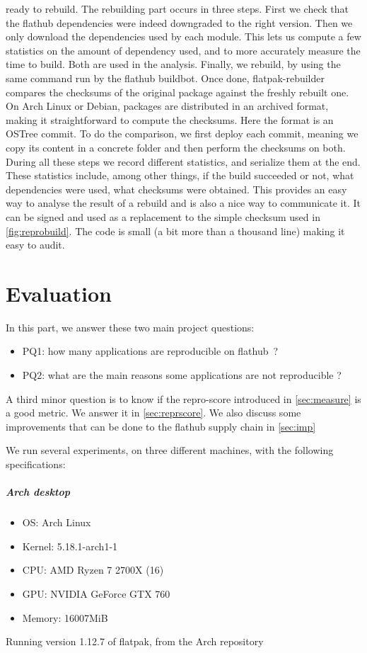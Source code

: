 \documentclass[a4paper,11pt,oneside]{report}
\theoremstyle{definition}
\newcommand{\sysname}{flatpak-rebuilder\xspace}
\newcommand{\fp}{flatpak\xspace}
\newcommand{\fh}{flathub\xspace}
\newcommand{\fhbb}{flathub buildbot\xspace}
\newcommand{\ot}{OSTree\xspace}
\begin{document}
ready to rebuild. The rebuilding part occurs in three steps. First we check
that the \fh dependencies were indeed downgraded to the right version. Then we
only download the dependencies used by each module. This lets us compute a few
statistics on the amount of dependency used, and to more accurately measure the
time to build. Both are used in the analysis. Finally, we rebuild, by using the
same command run by the \fhbb. Once done, \sysname compares the checksums of
the original package against the freshly rebuilt one. On Arch Linux or Debian,
packages are distributed in an archived format, making it straightforward to
compute the checksums. Here the format is an \ot commit. To do the
comparison, we first deploy each commit, meaning we copy its content in a
concrete folder and then perform the checksums on both. During all these steps
we record different statistics, and serialize them at the end. These statistics
include, among other things, if the build succeeded or not, what dependencies
were used, what checksums were obtained. This provides an easy way to analyse
the result of a rebuild and is also a nice way to communicate it. It can be
signed and used as a replacement to the simple checksum used in
\autoref{fig:reprobuild}. The code is small (a bit more than a thousand line)
making it easy to audit.

\chapter{Evaluation}
\label{chap:eval}

In this part, we answer these two main project questions:
\begin{itemize}
    \item PQ1: how many applications are reproducible on \fh~?
    \item PQ2: what are the main reasons some applications are not reproducible ?
\end{itemize}
A third minor question is to know if the repro-score introduced in
\autoref{sec:measure} is a good metric. We answer it in
\autoref{sec:reprscore}. We also discuss some improvements that can be done to
the \fh supply chain in \autoref{sec:imp}

\noindent
We run several experiments, on three different machines, with the following
specifications:
\paragraph{Arch desktop}
\begin{itemize}
    \label{arch-desktop}
    \item OS: Arch Linux
    \item Kernel: 5.18.1-arch1-1
    \item CPU: AMD Ryzen 7 2700X (16)
    \item GPU: NVIDIA GeForce GTX 760
    \item Memory: 16007MiB
\end{itemize}
Running version 1.12.7 of \fp, from the Arch repository
\end{document}

